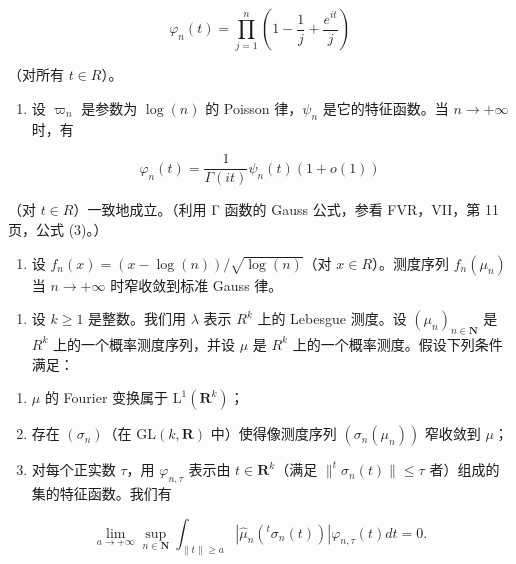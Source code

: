 \[
\varphi_ {n} (t) = \prod_ {j = 1} ^ {n} \left(1 - \frac {1}{j} + \frac {e ^ {i t}}{j}\right)
\]

（对所有 \(t \in R\)）。

\begin{enumerate}
\def\labelenumi{\alph{enumi})}
\setcounter{enumi}{1}
\tightlist
\item
  设 \(\varpi_{n}\) 是参数为 \(\log(n)\) 的 Poisson 律，\(\psi_{n}\) 是它的特征函数。当 \(n \to +\infty\) 时，有
\end{enumerate}

\[
\varphi_ {n} (t) = \frac {1}{\Gamma (i t)} \psi_ {n} (t) (1 + o (1))
\]

（对 \(t \in R\)）一致地成立。（利用 Γ 函数的 Gauss 公式，参看 FVR，VII，第 11 页，公式 (3)。）

\begin{enumerate}
\def\labelenumi{\alph{enumi})}
\setcounter{enumi}{2}
\tightlist
\item
  设 \(f_{n}(x) = (x - \log(n))/\sqrt{\log(n)}\)（对 \(x \in R\)）。测度序列 \(f_{n}(\mu_{n})\) 当 \(n \to +\infty\) 时窄收敛到标准 Gauss 律。
\end{enumerate}

\begin{enumerate}
\def\labelenumi{\arabic{enumi})}
\setcounter{enumi}{42}
\tightlist
\item
  设 \(k \geqslant 1\) 是整数。我们用 \(\lambda\) 表示 \(R^{k}\) 上的 Lebesgue 测度。设 \((\mu_{n})_{n \in \mathbf{N}}\) 是 \(R^{k}\) 上的一个概率测度序列，并设 \(\mu\) 是 \(R^{k}\) 上的一个概率测度。假设下列条件满足：
\end{enumerate}

\begin{enumerate}
\def\labelenumi{(\roman{enumi})}
\item
  \(\mu\) 的 Fourier 变换属于 \(\mathrm{L}^1 (\mathbf{R}^k)\)；
\item
  存在 \((\sigma_{n})\)（在 \(\mathrm{GL}(k,\mathbf{R})\) 中）使得像测度序列 \((\sigma_{n}(\mu_{n}))\) 窄收敛到 \(\mu\)；
\item
  对每个正实数 \(\tau\)，用 \(\varphi_{n,\tau}\) 表示由 \(t \in \mathbf{R}^k\)（满足 \(\|^{t} \sigma_{n}(t) \| \leqslant \tau\) 者）组成的集的特征函数。我们有
\end{enumerate}

\[
\lim _ {a \to + \infty} \sup _ {n \in \mathbf {N}} \int_ {\| t \| \geqslant a} | \widehat {\mu} _ {n} (^ {t} \sigma_ {n} (t)) | \varphi_ {n, \tau} (t) d t = 0.
\]


